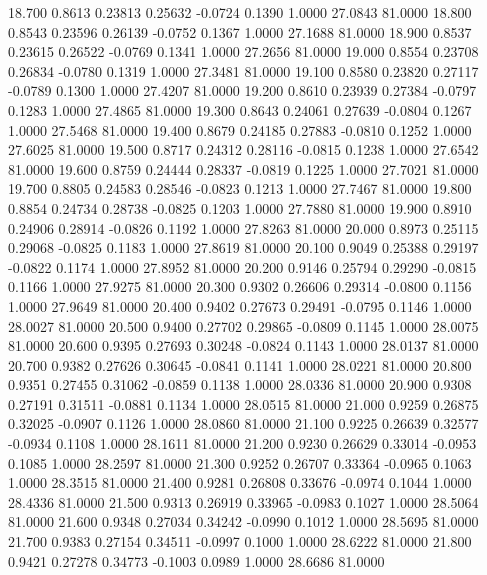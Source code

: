   18.700   0.8613   0.23813   0.25632  -0.0724   0.1390   1.0000  27.0843  81.0000
  18.800   0.8543   0.23596   0.26139  -0.0752   0.1367   1.0000  27.1688  81.0000
  18.900   0.8537   0.23615   0.26522  -0.0769   0.1341   1.0000  27.2656  81.0000
  19.000   0.8554   0.23708   0.26834  -0.0780   0.1319   1.0000  27.3481  81.0000
  19.100   0.8580   0.23820   0.27117  -0.0789   0.1300   1.0000  27.4207  81.0000
  19.200   0.8610   0.23939   0.27384  -0.0797   0.1283   1.0000  27.4865  81.0000
  19.300   0.8643   0.24061   0.27639  -0.0804   0.1267   1.0000  27.5468  81.0000
  19.400   0.8679   0.24185   0.27883  -0.0810   0.1252   1.0000  27.6025  81.0000
  19.500   0.8717   0.24312   0.28116  -0.0815   0.1238   1.0000  27.6542  81.0000
  19.600   0.8759   0.24444   0.28337  -0.0819   0.1225   1.0000  27.7021  81.0000
  19.700   0.8805   0.24583   0.28546  -0.0823   0.1213   1.0000  27.7467  81.0000
  19.800   0.8854   0.24734   0.28738  -0.0825   0.1203   1.0000  27.7880  81.0000
  19.900   0.8910   0.24906   0.28914  -0.0826   0.1192   1.0000  27.8263  81.0000
  20.000   0.8973   0.25115   0.29068  -0.0825   0.1183   1.0000  27.8619  81.0000
  20.100   0.9049   0.25388   0.29197  -0.0822   0.1174   1.0000  27.8952  81.0000
  20.200   0.9146   0.25794   0.29290  -0.0815   0.1166   1.0000  27.9275  81.0000
  20.300   0.9302   0.26606   0.29314  -0.0800   0.1156   1.0000  27.9649  81.0000
  20.400   0.9402   0.27673   0.29491  -0.0795   0.1146   1.0000  28.0027  81.0000
  20.500   0.9400   0.27702   0.29865  -0.0809   0.1145   1.0000  28.0075  81.0000
  20.600   0.9395   0.27693   0.30248  -0.0824   0.1143   1.0000  28.0137  81.0000
  20.700   0.9382   0.27626   0.30645  -0.0841   0.1141   1.0000  28.0221  81.0000
  20.800   0.9351   0.27455   0.31062  -0.0859   0.1138   1.0000  28.0336  81.0000
  20.900   0.9308   0.27191   0.31511  -0.0881   0.1134   1.0000  28.0515  81.0000
  21.000   0.9259   0.26875   0.32025  -0.0907   0.1126   1.0000  28.0860  81.0000
  21.100   0.9225   0.26639   0.32577  -0.0934   0.1108   1.0000  28.1611  81.0000
  21.200   0.9230   0.26629   0.33014  -0.0953   0.1085   1.0000  28.2597  81.0000
  21.300   0.9252   0.26707   0.33364  -0.0965   0.1063   1.0000  28.3515  81.0000
  21.400   0.9281   0.26808   0.33676  -0.0974   0.1044   1.0000  28.4336  81.0000
  21.500   0.9313   0.26919   0.33965  -0.0983   0.1027   1.0000  28.5064  81.0000
  21.600   0.9348   0.27034   0.34242  -0.0990   0.1012   1.0000  28.5695  81.0000
  21.700   0.9383   0.27154   0.34511  -0.0997   0.1000   1.0000  28.6222  81.0000
  21.800   0.9421   0.27278   0.34773  -0.1003   0.0989   1.0000  28.6686  81.0000
